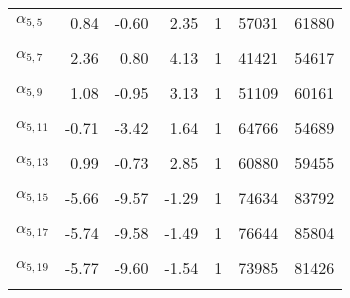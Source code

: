 \begin{longtable}[t]{lrrrrrr}
$\alpha_{5, 5}$ & 0.84 & -0.60 & 2.35 & 1 & 57031 & 61880\\
\cellcolor{gray!6}{$\alpha_{5, 6}$} & \cellcolor{gray!6}{-5.91} & \cellcolor{gray!6}{-9.60} & \cellcolor{gray!6}{-1.82} & \cellcolor{gray!6}{1} & \cellcolor{gray!6}{75184} & \cellcolor{gray!6}{85477}\\
$\alpha_{5, 7}$ & 2.36 & 0.80 & 4.13 & 1 & 41421 & 54617\\
\cellcolor{gray!6}{$\alpha_{5, 8}$} & \cellcolor{gray!6}{1.62} & \cellcolor{gray!6}{0.19} & \cellcolor{gray!6}{3.14} & \cellcolor{gray!6}{1} & \cellcolor{gray!6}{43050} & \cellcolor{gray!6}{56273}\\
$\alpha_{5, 9}$ & 1.08 & -0.95 & 3.13 & 1 & 51109 & 60161\\
\cellcolor{gray!6}{$\alpha_{5, 10}$} & \cellcolor{gray!6}{5.65} & \cellcolor{gray!6}{1.17} & \cellcolor{gray!6}{9.58} & \cellcolor{gray!6}{1} & \cellcolor{gray!6}{72809} & \cellcolor{gray!6}{78162}\\
$\alpha_{5, 11}$ & -0.71 & -3.42 & 1.64 & 1 & 64766 & 54689\\
\cellcolor{gray!6}{$\alpha_{5, 12}$} & \cellcolor{gray!6}{2.67} & \cellcolor{gray!6}{0.68} & \cellcolor{gray!6}{5.20} & \cellcolor{gray!6}{1} & \cellcolor{gray!6}{58674} & \cellcolor{gray!6}{54547}\\
$\alpha_{5, 13}$ & 0.99 & -0.73 & 2.85 & 1 & 60880 & 59455\\
\cellcolor{gray!6}{$\alpha_{5, 14}$} & \cellcolor{gray!6}{1.27} & \cellcolor{gray!6}{-0.33} & \cellcolor{gray!6}{3.03} & \cellcolor{gray!6}{1} & \cellcolor{gray!6}{59824} & \cellcolor{gray!6}{56296}\\
$\alpha_{5, 15}$ & -5.66 & -9.57 & -1.29 & 1 & 74634 & 83792\\
\cellcolor{gray!6}{$\alpha_{5, 16}$} & \cellcolor{gray!6}{6.14} & \cellcolor{gray!6}{2.18} & \cellcolor{gray!6}{9.63} & \cellcolor{gray!6}{1} & \cellcolor{gray!6}{70035} & \cellcolor{gray!6}{78279}\\
$\alpha_{5, 17}$ & -5.74 & -9.58 & -1.49 & 1 & 76644 & 85804\\
\cellcolor{gray!6}{$\alpha_{5, 18}$} & \cellcolor{gray!6}{-0.42} & \cellcolor{gray!6}{-2.14} & \cellcolor{gray!6}{1.14} & \cellcolor{gray!6}{1} & \cellcolor{gray!6}{69844} & \cellcolor{gray!6}{59971}\\
$\alpha_{5, 19}$ & -5.77 & -9.60 & -1.54 & 1 & 73985 & 81426\\
\cellcolor{gray!6}{$\alpha_{5, 20}$} & \cellcolor{gray!6}{0.47} & \cellcolor{gray!6}{-1.07} & \cellcolor{gray!6}{2.03} & \cellcolor{gray!6}{1} & \cellcolor{gray!6}{65083} & \cellcolor{gray!6}{63149}\\

\end{longtable}
